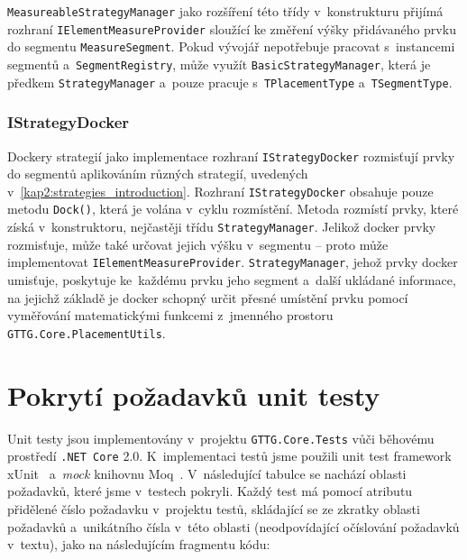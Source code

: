 \texttt{MeasureableStrategyManager} jako rozšíření této třídy v~konstrukturu přijímá rozhraní \texttt{IElementMeasureProvider} sloužící ke změření výšky přidávaného prvku do segmentu \texttt{MeasureSegment}. Pokud vývojář nepotřebuje pracovat s~instancemi segmentů a~\texttt{SegmentRegistry}, může využít  \texttt{BasicStrategyManager}, která je předkem \texttt{StrategyManager} a~pouze pracuje s~\texttt{TPlacementType} \linebreak a~\texttt{TSegmentType}.

\subsubsection*{IStrategyDocker}
Dockery strategií jako implementace rozhraní \texttt{IStrategyDocker} rozmisťují prvky do segmentů aplikováním různých strategií, uvedených v~\ref{kap2:strategies_introduction}. Rozhraní \texttt{IStrategyDocker} obsahuje pouze metodu \texttt{Dock()}, která je volána v~cyklu rozmístění.
Metoda rozmístí prvky, které získá v~konstruktoru, nejčastěji třídu \linebreak \texttt{StrategyManager}. Jelikož docker prvky rozmisťuje, může také určovat jejich výšku v~segmentu -- proto může implementovat \texttt{IElementMeasureProvider}. \linebreak \texttt{StrategyManager}, jehož prvky docker umisťuje, poskytuje ke~každému prvku jeho segment a~další ukládané informace, na jejichž základě je docker schopný určit přesné umístění prvku pomocí vyměřování matematickými funkcemi z~jmenného prostoru \texttt{GTTG.Core.PlacementUtils}.

\newpage
\section{Pokrytí požadavků unit testy}
\label{kap4:requirements_coverage}
\newcommand{\comp}[0]{\textbf{\color{red}COMP}}
\newcommand{\dti}[0]{\textbf{\color{blue}DTI}}
\newcommand{\ve}[0]{\textbf{\color{green}VE}}
\newcommand{\dl}[0]{\textbf{\color{orange}DL}}
\newcommand{\hit}[0]{\textbf{\color{purple}HT}}

Unit testy jsou implementovány v~projektu \texttt{GTTG.Core.Tests} vůči běhovému prostředí \texttt{.NET Core} 2.0. K~implementaci testů jsme použili unit test framework xUnit~\cite{xUnit} a~\textit{mock} knihovnu Moq~\cite{moq}. V~následující tabulce se nachází oblasti požadavků, které jsme v~testech pokryli. Každý test má pomocí atributu přidělené číslo požadavku v~projektu testů, skládající se ze zkratky oblasti požadavků a~unikátního čísla v~této oblasti (neodpovídající očíslování požadavků v~textu), jako na následujícím fragmentu kódu:

